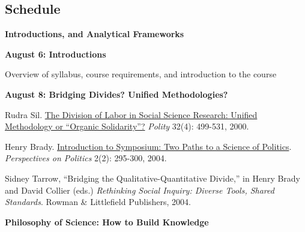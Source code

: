 \documentclass[letterpaper]{article}
\renewenvironment{itemize}{
  \begin{list}{}{
    \setlength{\leftmargin}{1.5em}
  }
}{
  \end{list}
}
\begin{document}
\subsection*{Schedule}

\begin{enumerate}

\item {\bf Introductions, and Analytical Frameworks}
	\begin{itemize}
		\item {\bf August 6: Introductions}
			\begin{itemize}
				\item[$\bullet$] Overview of syllabus, course requirements, and introduction to the course
			\end{itemize}

		\item {\bf August 8: Bridging Divides? Unified Methodologies?}
		\begin{itemize}
			\item[$\bullet$] Rudra Sil. \href{https://www.journals.uchicago.edu/doi/abs/10.2307/3235291}{The Division of Labor in Social Science Research: Unified Methodology or ``Organic Solidarity''?} \emph{Polity} 32(4): 499-531, 2000.
			\item[$\bullet$] Henry Brady. \href{http://www.jstor.org/stable/3688441}{Introduction to Symposium: Two Paths to a Science of Politics}. \emph{Perspectives on Politics} 2(2): 295-300, 2004.  %
			\item[$\bullet$] Sidney Tarrow, ``Bridging the Qualitative-Quantitative Divide,'' in  Henry Brady and David Collier (eds.) \emph{Rethinking Social Inquiry: Diverse Tools, Shared Standards}. Rowman \& Littlefield Publishers, 2004.
		\end{itemize}
	\end{itemize}

\item {\bf Philosophy of Science: How to Build Knowledge}



\end{enumerate}
\end{document}
